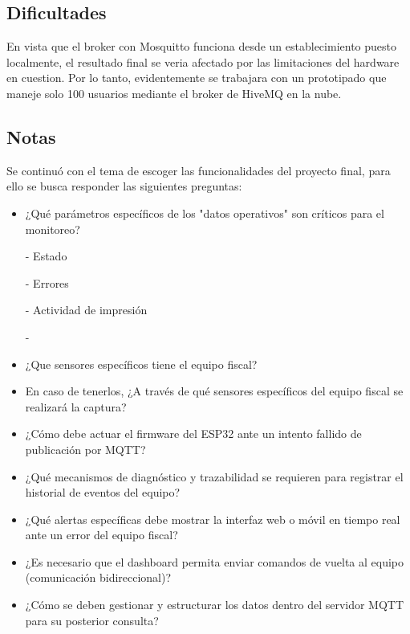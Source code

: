 \documentclass[12pt, a4paper]{article}
\begin{document}
    \subsection*{Dificultades}

    En vista que el broker con Mosquitto funciona desde un establecimiento puesto localmente, el resultado final se veria afectado por las limitaciones del hardware en cuestion. Por lo tanto, evidentemente se trabajara con un prototipado que maneje solo 100 usuarios mediante el broker de HiveMQ en la nube. 

    \subsection*{Notas}

    Se continuó con el tema de escoger las funcionalidades del proyecto final, para ello se busca responder las siguientes preguntas:

    \begin{itemize}
        \item ¿Qué parámetros específicos de los "datos operativos" son críticos para el monitoreo?

        - Estado
        
        - Errores
        
        - Actividad de impresión

        -
    
        \item ¿Que sensores específicos tiene el equipo fiscal?

        \item En caso de tenerlos, ¿A través de qué sensores específicos del equipo fiscal se realizará la captura?
    
        \item ¿Cómo debe actuar el firmware del ESP32 ante un intento fallido de publicación por MQTT? 
    
        \item ¿Qué mecanismos de diagnóstico y trazabilidad se requieren para registrar el historial de eventos del equipo?
    
        \item ¿Qué alertas específicas debe mostrar la interfaz web o móvil en tiempo real ante un error del equipo fiscal? 
    
        \item ¿Es necesario que el dashboard permita enviar comandos de vuelta al equipo (comunicación bidireccional)?
    
        \item ¿Cómo se deben gestionar y estructurar los datos dentro del servidor MQTT para su posterior consulta?

    \end{itemize}
\end{document}
